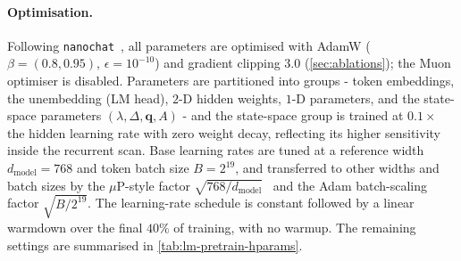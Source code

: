 \documentclass{article}
\begin{document}
\paragraph{Optimisation.} Following \texttt{nanochat}~\citep{nanochat}, all
parameters are optimised with AdamW ($\beta=(0.8,0.95)$, $\epsilon=10^{-10}$) and
gradient clipping $3.0$ (\cref{sec:ablations}); the Muon optimiser is disabled.
Parameters are partitioned into groups - token embeddings, the unembedding (LM
head), $2$-D hidden weights, $1$-D parameters, and the state-space parameters
$(\lambda,\Delta,\mathbf{q},A)$ - and the state-space group is trained at
$0.1\times$ the hidden learning rate with zero weight decay, reflecting its higher
sensitivity inside the recurrent scan. Base learning rates are tuned at a
reference width $d_{\text{model}}=768$ and token batch size $B=2^{19}$, and
transferred to other widths and batch sizes by the $\mu$P-style
factor $\sqrt{768/d_{\text{model}}}$~\citep{yang2021tuning} and the Adam
batch-scaling factor $\sqrt{B/2^{19}}$. The learning-rate schedule is constant
followed by a linear warmdown over the final $40\%$ of training, with no warmup.
The remaining settings are summarised in \cref{tab:lm-pretrain-hparams}.
\end{document}

